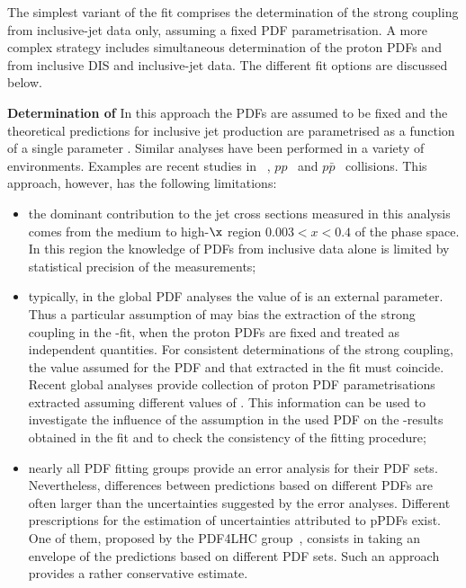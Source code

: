 The simplest variant of the fit comprises the determination of the strong coupling \asz from inclusive-jet data only, assuming a fixed PDF parametrisation. A more complex strategy includes simultaneous determination of the proton PDFs and \asz from inclusive DIS and inclusive-jet data. The different fit options are discussed below.
 
{\flushleft \textbf{Determination of \asz}}\newline
In this approach the PDFs are assumed to be fixed and the theoretical predictions for inclusive jet production are parametrised as a function of a single parameter \asz. Similar analyses have been performed in a variety of environments. Examples are recent studies in \ep~\cite{np:b864:1,epj:c75:65}, $pp$~\cite{CMS:2014mna,Chatrchyan:2013txa} and $p\bar{p}$~\cite{Affolder:2001hn,Abazov:2012lua,Abazov:2009nc} collisions. This approach, however, has the following limitations:
\begin{itemize}
 \item the dominant contribution to the jet cross sections measured in this analysis comes from the medium to high-$\x$ region $0.003<x<0.4$ of the phase space. In this region the knowledge of PDFs from \hera inclusive data alone is limited by statistical precision of the measurements;
 \item typically, in the global PDF analyses the value of \asz is an external parameter. Thus a particular assumption of \asz may bias the extraction of the strong coupling in the \as-fit, when the proton PDFs are fixed and treated as independent quantities. For consistent determinations of the strong coupling, the value assumed for the PDF and that extracted in the fit must coincide. Recent global analyses provide collection of proton PDF parametrisations extracted assuming different values of \asz. This information can be used to investigate the influence of the \asz assumption in the used PDF on the \as-results obtained in the fit and to check the consistency of the fitting procedure;
 \item nearly all PDF fitting groups provide an error analysis for their PDF sets. Nevertheless, differences between predictions based on different PDFs are often larger than the uncertainties suggested by the error analyses. Different prescriptions for the estimation of uncertainties attributed to pPDFs exist. One of them, proposed by the PDF4LHC group~\cite{pdf4lhc:2011}, consists in taking an envelope of the predictions based on different PDF sets. Such an approach provides a rather conservative estimate. 
\end{itemize}

